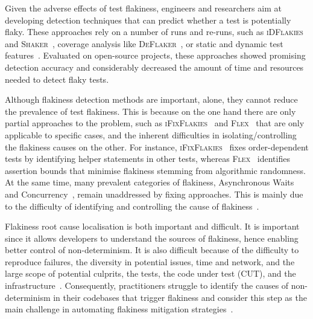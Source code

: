 Given the adverse effects of test flakiness, engineers and researchers aim at developing 
detection techniques that can predict whether a test is potentially flaky. These approaches rely on a number of runs and re-runs, such as \textsc{iDFlakies}~\cite{Lam2019iDFlakies} and \textsc{Shaker}~\cite{Silva2020}, coverage analysis like \textsc{DeFlaker}~\cite{Bell2018}, or static and dynamic test features~\cite{alshammari2021flakeflagger,Haben2021,Pinto2020,Dong2021,Camara2021VocabExtendedReplication,Camara2021a,Fatima2021}.  
Evaluated on open-source projects, these approaches showed promising detection accuracy and considerably decreased the amount of time and resources needed to detect flaky tests. 

Although flakiness detection methods are important, alone, they cannot reduce the prevalence of test flakiness. This is because on the one hand there are only partial approaches to  the problem,  such as  \textsc{iFixFlakies}~\cite{Shi2019iFix} and \textsc{Flex}~\cite{FLEX} that are only applicable to specific cases, and the inherent difficulties in isolating/controlling the flakiness causes on the other. For instance, \textsc{iFixFlakies}~\cite{Shi2019iFix} fixes order-dependent tests by identifying helper statements in other tests, whereas \textsc{Flex}~\cite{FLEX} identifies  assertion bounds that minimise flakiness stemming from algorithmic randomness. At the same time, many prevalent categories of flakiness, \eg  Asynchronous Waits and Concurrency~\cite{Gruber2021,romano2021empirical,Luo2014, Eck2019}, remain unaddressed by fixing approaches. This is mainly due to the difficulty of identifying  and controlling the cause of flakiness~\cite{Eck2019}. 

Flakiness root cause localisation is both important and difficult. It is important since it allows developers to understand the sources of flakiness, hence enabling better control of non-determinism. It is also difficult because of the difficulty to reproduce failures, the diversity in potential issues, \eg time and network, and the large scope of potential culprits, \eg the tests, the code under test (CUT), and the infrastructure~\cite{Gruber2021}. Consequently, practitioners struggle to identify the causes of non-determinism in their codebases that trigger flakiness and consider this step as the main challenge in automating flakiness mitigation strategies~\cite{Eck2019}. 

